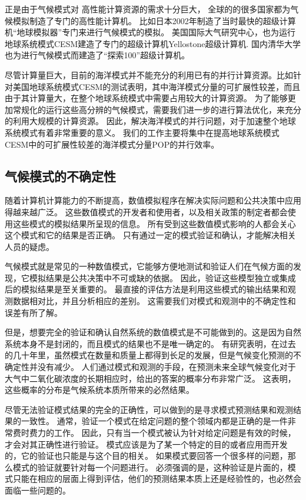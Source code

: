 正是由于气候模式对 高性能计算资源的需求十分巨大， 全球的的很多国家都为气候模拟制造了专门的高性能计算机。 比如日本2002年制造了当时最快的超级计算机“地球模拟器”专门来进行气候模式的模拟\cite{habata2003earth}。
美国国际大气研究中心，也为运行地球系统模式CESM建造了专门的超级计算机Yellostone超级计算机\cite{loft:2015}. 
国内清华大学也为进行气候模式而建造了“探索100”超级计算机。



尽管计算量巨大，目前的海洋模式并不能充分的利用已有的并行计算资源。比如针对美国地球系统模式CESM的测试表明，其中海洋模式分量的可扩展性较差，而且由于其计算量大，在整个地球系统模式中需要占用较大的计算资源。
为了能够更加常规化的运行这些高分辨的气候模式，需要我们进一步的进行算法优化，来充分的利用大规模的计算资源。
因此，解决海洋模式的并行问题，对于加速整个地球系统模式有着非常重要的意义。
我们的工作主要将集中在提高地球系统模式CESM中的可扩展性较差的海洋模式分量POP的并行效率。  
 

\subsection{气候模式的不确定性}
随着计算机计算能力的不断提高，数值模拟程序在解决实际问题和公共决策中应用得越来越广泛。 
这些数值模式的开发者和使用者，以及相关政策的制定者都会使用这些模式的模拟结果所呈现的信息。
所有受到这些数值模式影响的人都会关心这个模式和它的结果是否正确。
只有通过一定的模式验证和确认，才能解决相关人员的疑虑\cite{whitner1989guidelines,stainforth2005uncertainty}。

气候模式就是常见的一种数值模式，它能够方便地测试和验证人们在气候方面的发现，它模拟结果是公共决策中不可或缺的依据\cite{allen2002towards,reynolds1994random}。
因此，验证这些模型独立或集成后的模拟结果是至关重要的。
最直接的评估方法是利用这些模式的输出结果和观测数据相对比，并且分析相应的差别。 
这需要我们对模式和观测中的不确定性和误差有所了解。 

但是，想要完全的验证和确认自然系统的数值模式是不可能做到的。这是因为自然系统本身不是封闭的，而且模式的结果也不是唯一确定的\cite{oreskes1994verification}。
有研究表明，在过去的几十年里，虽然模式在数量和质量上都得到长足的发展，但是气候变化预测的不确定性并没有减少。 
人们通过模式和观测的手段，在预测未来全球气候变化对于大气中二氧化碳浓度的长期相应时，给出的答案的概率分布非常广泛。
这表明，这些概率的分布是气候系统本质所带来的必然结果\cite{roe2007climate}。 

尽管无法验证模式结果的完全的正确性，可以做到的是寻求模式预测结果和观测结果的一致性。
通常，验证一个模式在给定问题的整个领域内都是正确的是一件非常费时费力的工作。 
因此，只有当一个模式被认为针对给定问题是有效的时候，才会对其正确性进行验证。 
模式应该是为了某一个特定的目的或者应用而开发的，它的验证也只能是与这个目的相关\cite{sargent2005verification}。
如果模式要回答一个很多样的问题，那么模式的验证就要针对每一个问题进行。
必须强调的是，这种验证是片面的，模式只能在相应的层面上得到评估，他们的预测结果本质上还是经验性的，也必然会面临一些问题的。


